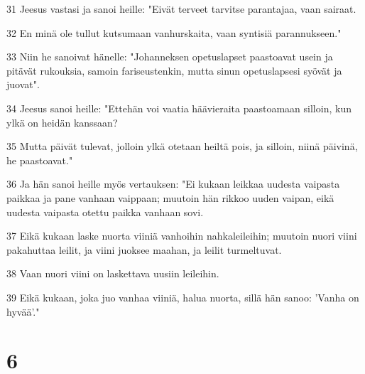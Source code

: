 \par 31 Jeesus vastasi ja sanoi heille: "Eivät terveet tarvitse parantajaa, vaan sairaat.
\par 32 En minä ole tullut kutsumaan vanhurskaita, vaan syntisiä parannukseen."
\par 33 Niin he sanoivat hänelle: "Johanneksen opetuslapset paastoavat usein ja pitävät rukouksia, samoin fariseustenkin, mutta sinun opetuslapsesi syövät ja juovat".
\par 34 Jeesus sanoi heille: "Ettehän voi vaatia häävieraita paastoamaan silloin, kun ylkä on heidän kanssaan?
\par 35 Mutta päivät tulevat, jolloin ylkä otetaan heiltä pois, ja silloin, niinä päivinä, he paastoavat."
\par 36 Ja hän sanoi heille myös vertauksen: "Ei kukaan leikkaa uudesta vaipasta paikkaa ja pane vanhaan vaippaan; muutoin hän rikkoo uuden vaipan, eikä uudesta vaipasta otettu paikka vanhaan sovi.
\par 37 Eikä kukaan laske nuorta viiniä vanhoihin nahkaleileihin; muutoin nuori viini pakahuttaa leilit, ja viini juoksee maahan, ja leilit turmeltuvat.
\par 38 Vaan nuori viini on laskettava uusiin leileihin.
\par 39 Eikä kukaan, joka juo vanhaa viiniä, halua nuorta, sillä hän sanoo: 'Vanha on hyvää'."

\chapter{6}


